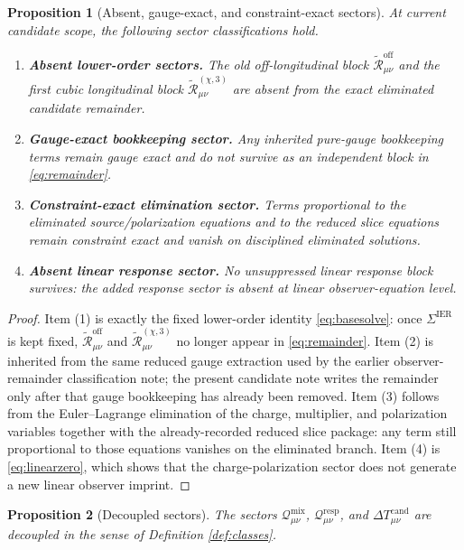 \documentclass[11pt]{article}
\newcommand{\BaseShift}{\Sigma^{\mathrm{IER}}}
\newcommand{\ReOff}{\widetilde{\mathcal R}_{\mu\nu}^{\mathrm{off}}}
\newcommand{\ReLongThree}{\widetilde{\mathcal R}_{\mu\nu}^{(\chi,3)}}
\newcommand{\DeltaTCand}{\Delta T_{\mu\nu}^{\mathrm{cand}}}
\newcommand{\MixQuad}{\mathcal Q_{\mu\nu}^{\mathrm{mix}}}
\newcommand{\RespQuad}{\mathcal Q_{\mu\nu}^{\mathrm{resp}}}
\newtheorem{proposition}{Proposition}
\begin{document}
\begin{proposition}[Absent, gauge-exact, and constraint-exact sectors]
\label{prop:absent}
At current candidate scope, the following sector classifications hold.
\begin{enumerate}
    \item \textbf{Absent lower-order sectors.} The old off-longitudinal block \(\ReOff\) and the first cubic longitudinal block \(\ReLongThree\) are absent from the exact eliminated candidate remainder.
    \item \textbf{Gauge-exact bookkeeping sector.} Any inherited pure-gauge bookkeeping terms remain gauge exact and do not survive as an independent block in \eqref{eq:remainder}.
    \item \textbf{Constraint-exact elimination sector.} Terms proportional to the eliminated source/polarization equations and to the reduced slice equations remain constraint exact and vanish on disciplined eliminated solutions.
    \item \textbf{Absent linear response sector.} No unsuppressed linear response block survives: the added response sector is absent at linear observer-equation level.
\end{enumerate}
\end{proposition}

\begin{proof}
Item (1) is exactly the fixed lower-order identity \eqref{eq:basesolve}: once \(\BaseShift\) is kept fixed, \(\ReOff\) and \(\ReLongThree\) no longer appear in \eqref{eq:remainder}. Item (2) is inherited from the same reduced gauge extraction used by the earlier observer-remainder classification note; the present candidate note writes the remainder only after that gauge bookkeeping has already been removed. Item (3) follows from the Euler--Lagrange elimination of the charge, multiplier, and polarization variables together with the already-recorded reduced slice package: any term still proportional to those equations vanishes on the eliminated branch. Item (4) is \eqref{eq:linearzero}, which shows that the charge-polarization sector does not generate a new linear observer imprint.
\end{proof}

\begin{proposition}[Decoupled sectors]
\label{prop:decoupled}
The sectors \(\MixQuad\), \(\RespQuad\), and \(\DeltaTCand\) are decoupled in the sense of Definition \ref{def:classes}.
\end{proposition}
\end{document}
